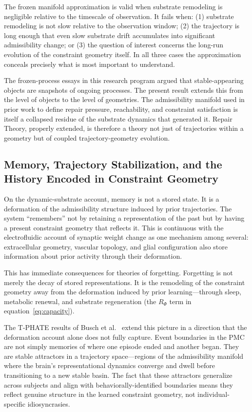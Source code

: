 \documentclass[12pt,a4paper]{article}
\begin{document}
The frozen manifold approximation is valid when substrate remodeling is negligible relative to the timescale of observation. It fails when: (1) substrate remodeling is not slow relative to the observation window; (2) the trajectory is long enough that even slow substrate drift accumulates into significant admissibility change; or (3) the question of interest concerns the long-run evolution of the constraint geometry itself. In all three cases the approximation conceals precisely what is most important to understand.

The frozen-process essays in this research program argued that stable-appearing objects are snapshots of ongoing processes. The present result extends this from the level of objects to the level of geometries. The admissibility manifold used in prior work to define repair pressure, reachability, and constraint satisfaction is itself a collapsed residue of the substrate dynamics that generated it. Repair Theory, properly extended, is therefore a theory not just of trajectories within a geometry but of coupled trajectory-geometry evolution.

\subsection{Memory, Trajectory Stabilization, and the History Encoded in Constraint Geometry}

On the dynamic-substrate account, memory is not a stored state. It is a deformation of the admissibility structure induced by prior trajectories. The system ``remembers'' not by retaining a representation of the past but by having a present constraint geometry that reflects it. This is continuous with the electrofluidic account of synaptic weight change as one mechanism among several: extracellular geometry, vascular topology, and glial configuration also store information about prior activity through their deformation.

This has immediate consequences for theories of forgetting. Forgetting is not merely the decay of stored representations. It is the remodeling of the constraint geometry away from the deformation induced by prior learning---through sleep, metabolic renewal, and substrate regeneration (the $R_\Phi$ term in equation~\eqref{eq:capacity}).

The T-PHATE results of Busch et al.~\cite{busch2022} extend this picture in a direction that the deformation account alone does not fully capture. Event boundaries in the PMC are not simply memories of where one episode ended and another began. They are stable attractors in a trajectory space---regions of the admissibility manifold where the brain's representational dynamics converge and dwell before transitioning to a new stable basin. The fact that these attractors generalize across subjects and align with behaviorally-identified boundaries means they reflect genuine structure in the learned constraint geometry, not individual-specific idiosyncrasies.
\end{document}
